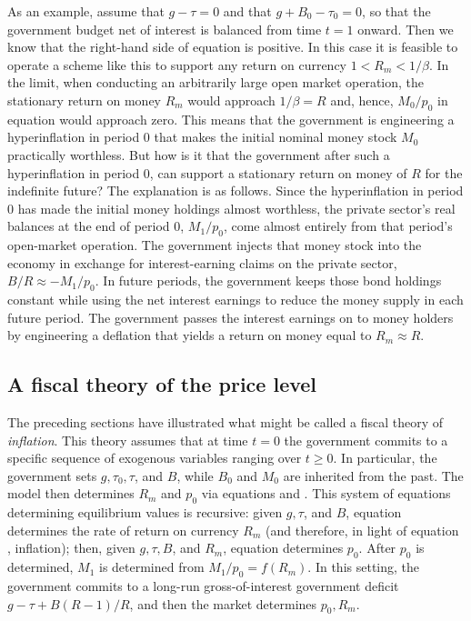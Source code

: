 As an example,
assume that $g-\tau = 0$ and that $g + B_0 - \tau_0 =0$,
so that the government budget net of interest is balanced
from time $t=1$ onward.  Then we know that the right-hand side of
equation  is positive.  In this case it is feasible to operate
a scheme like this to support any return on currency
$1 < R_m < 1/\beta$. In the limit, when conducting an arbitrarily
large open market operation, the stationary return on money $R_m$ would
approach $1/\beta=R$ and, hence, $M_0/p_0$ in equation  would
approach zero. This means that the government is
engineering a hyperinflation in period $0$ that makes the
initial nominal money stock $M_0$ practically worthless.
But how is it that the government after such a hyperinflation
in period $0$, can support a stationary return on money of $R$
for the indefinite future? The explanation is as follows.
Since the hyperinflation in period $0$ has made the initial money holdings
almost worthless, the private sector's real balances at the end of
period $0$, $M_1/p_0$, come almost entirely from that period's
open-market operation. The government  injects that money stock
into the economy in exchange for interest-earning claims on the
private sector, $B/R \approx - M_1/p_0$. In future periods, the government
keeps those bond holdings constant while using the net interest earnings to
reduce the money supply in each future period. The government
passes  the interest earnings on to money holders by engineering a deflation
that yields a return on money equal to $R_m \approx R$.



\subsection{A fiscal theory of the price level}
The preceding sections have illustrated what might be
called  a fiscal theory of {\it inflation}.   This theory
assumes that at time $t=0$ the government commits to a specific sequence of exogenous variables
ranging over $t \geq 0$. In particular, the government sets $g, \tau_0, \tau$, and $B$, while
$B_0$ and $M_0$ are inherited from the past. The  model then determines $R_m$ and $p_0$ via equations
 and .  This system of equations determining equilibrium values is
recursive:
given $g, \tau$, and $B$, equation  determines the rate of
return on currency $R_m$ (and therefore, in light of equation , inflation); then,  given $g, \tau, B$, and $R_m$, equation
 determines $p_0$.  After $p_0$ is
determined, $M_1$ is determined from $M_1 / p_0 = f(R_m)$.
In this setting, the government  commits to a long-run gross-of-interest
 government deficit $g - \tau + B(R-1)/R$, and then the market
determines $p_0, R_m$.


